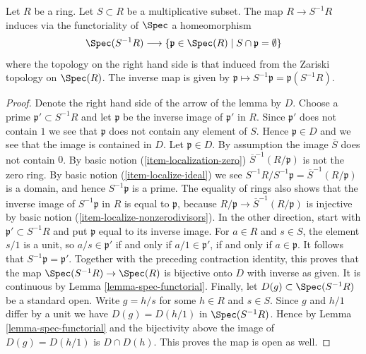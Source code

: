 \begin{lemma}
\label{lemma-spec-localization}
Let $R$ be a ring. Let $S \subset R$ be a multiplicative subset.
The map $R \to S^{-1}R$ induces via the functoriality of $\Spec$
a homeomorphism
$$
\Spec(S^{-1}R)
\longrightarrow
\{\mathfrak p \in \Spec(R) \mid S \cap \mathfrak p = \emptyset \}
$$
where the topology on the right hand side is that induced from the
Zariski topology on $\Spec(R)$. The inverse map is given
by $\mathfrak p \mapsto S^{-1}\mathfrak p = \mathfrak p(S^{-1}R)$.
\end{lemma}

\begin{proof}
Denote the right hand side of the arrow of the lemma by $D$.
Choose a prime $\mathfrak p' \subset S^{-1}R$ and let $\mathfrak p$ be
the inverse image of $\mathfrak p'$ in $R$. Since $\mathfrak p'$
does not contain $1$ we see that $\mathfrak p$ does not contain
any element of $S$. Hence $\mathfrak p \in D$ and we see that
the image is contained in $D$. Let $\mathfrak p \in D$.
By assumption the image $\overline{S}$ does not contain $0$.
By basic notion (\ref{item-localization-zero})
$\overline{S}^{-1}(R/\mathfrak p)$ is not the zero ring.
By basic notion (\ref{item-localize-ideal}) we see
$S^{-1}R / S^{-1}\mathfrak p = \overline{S}^{-1}(R/\mathfrak p)$
is a domain, and hence $S^{-1}\mathfrak p$ is a prime.
The equality of rings also shows that the inverse image of
$S^{-1}\mathfrak p$ in $R$ is equal to $\mathfrak p$,
because $R/\mathfrak p \to \overline{S}^{-1}(R/\mathfrak p)$
is injective by basic notion (\ref{item-localize-nonzerodivisors}).
In the other direction, start with $\mathfrak p'\subset S^{-1}R$
and put $\mathfrak p$ equal to its inverse image.
For $a\in R$ and $s\in S$, the element $s/1$ is a unit, so
$a/s\in\mathfrak p'$ if and only if $a/1\in\mathfrak p'$,
if and only if $a\in\mathfrak p$.
It follows that $S^{-1}\mathfrak p=\mathfrak p'$.
Together with the preceding contraction identity, this proves that
the map $\Spec(S^{-1}R) \to \Spec(R)$
is bijective onto $D$ with inverse as given.
It is continuous by Lemma \ref{lemma-spec-functorial}.
Finally, let $D(g) \subset \Spec(S^{-1}R)$ be a standard
open. Write $g = h/s$ for some $h\in R$ and $s\in S$.
Since $g$ and $h/1$ differ by a unit we have $D(g) =
D(h/1)$ in $\Spec(S^{-1}R)$.
Hence by Lemma \ref{lemma-spec-functorial} and the bijectivity
above the image of $D(g) = D(h/1)$ is $D \cap D(h)$.
This proves the map is open as well.
\end{proof}
